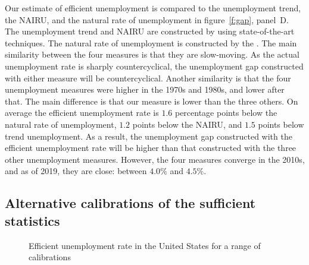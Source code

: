 \documentclass[letterpaper,12pt,leqno]{article}
\def\pdf{../../figures/xhosios_202103.pdf}
\begin{document}
Our estimate of efficient unemployment is compared to the unemployment trend, the NAIRU, and the natural rate of unemployment in figure~\ref{f:gap}, panel~D. The unemployment trend and NAIRU are constructed by  using state-of-the-art techniques. The natural rate of unemployment is constructed by the . The main similarity between the four measures is that they are slow-moving. As the actual unemployment rate is sharply countercyclical, the unemployment gap constructed with either measure will be countercyclical. Another similarity is that the four unemployment measures were higher in the 1970s and 1980s, and lower after that. The main difference is that our measure is lower than the three others. On average the efficient unemployment rate is $1.6$ percentage points below the natural rate of unemployment, $1.2$ points below the NAIRU, and $1.5$ points below trend unemployment. As a result, the unemployment gap constructed with the efficient unemployment rate will be higher than that constructed with the three other unemployment measures. However, the four measures converge in the 2010s, and as of 2019, they are close: between $4.0\%$ and $4.5\%$.

\subsection{Alternative calibrations of the sufficient statistics}

\begin{figure}[t!]
\hfill
{}\vfig
{}
\caption{Efficient unemployment rate in the United States for a range of calibrations}
\label{f:range}\end{figure}
\end{document}
